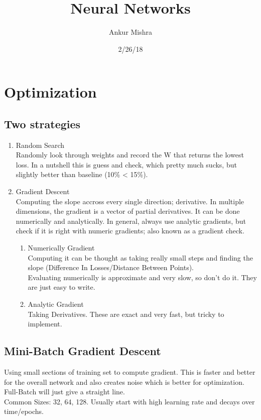 \documentclass[11pt]{article}
\author{Ankur Mishra}
\date{2/26/18}
\title{Neural Networks}
\begin{document}
\maketitle
\tableofcontents

\section{Optimization}
\label{sec-1}
\subsection{Two strategies}
\label{sec-1-1}
\begin{enumerate}
\item Random Search\\
\label{sec-1-1-0-1}
Randomly look through weights and record the W that returns the lowest loss. In a nutshell this is
guess and check, which pretty much sucks, but slightly better than baseline (10\% < 15\%).
\item Gradient Descent\\
\label{sec-1-1-0-2}
Computing the slope accross every single direction; derivative. In multiple dimensions, the gradient is a vector of
partial derivatives. It can be done numerically and analytically. In general, always use analytic gradients, but check if it is right with numeric gradients; also known as
a gradient check. 
\begin{enumerate}
\item Numerically Gradient\\
\label{sec-1-1-0-2-1}
Computing it can be thought as taking really small steps and finding the slope (Difference In Losses/Distance Between Points).\\
Evaluating numerically is approximate and very slow, so don't do it. They are just easy to write.
\item Analytic Gradient\\
\label{sec-1-1-0-2-2}
Taking Derivatives. These are exact and very fast, but tricky to implement.\\
\end{enumerate}
\end{enumerate}
\subsection{Mini-Batch Gradient Descent}
\label{sec-1-2}
Using small sections of training set to compute gradient. This is faster and better for the overall network 
and also creates noise which is better for optimization. Full-Batch will just give a straight line.\\
Common Sizes: 32, 64, 128.
Usually start with high learning rate and decays over time/epochs.
\end{document}
